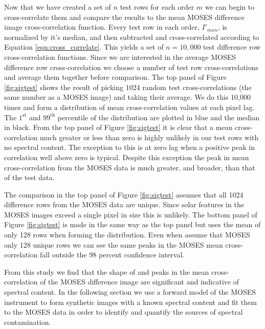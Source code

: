 		Now that we have created a set of $n$ test rows for each order $m$ we can begin to cross-correlate them and compare the results to the mean MOSES difference image cross-correlation function.
		Every test row in each order, $I'_{mxn}$, is normalized by it's median, and then subtracted and cross-correlated according to Equation \ref{eqn:cross_correlate}.
		This yields a set of $n = 10,000$ test difference row cross-correlation functions.
		Since we are interested in the average MOSES difference row cross-correlation we choose a number of test row cross-correlations and average them together before comparison.
		The top panel of Figure \ref{fig:sigtest} shows the result of picking 1024 random test cross-correlations (the same number as a MOSES image) and taking their average.
		We do this 10,000 times and form a distribution of mean cross-correlation values at each pixel lag.
		The $1^\text{st}$ and $99^\text{th}$ percentile of the distribution are plotted in blue and the median in black.
		From the top panel of Figure \ref{fig:sigtest} it is clear that a mean cross-correlation much greater or less than zero is highly unlikely in our test rows with no spectral content.
		The exception to this is at zero lag when a positive peak in correlation well above zero is typical.
		Despite this exception the peak in mean cross-correlation from the MOSES data is much greater, and broader, than that of the test data.
		
		The comparison in the top panel of Figure \ref{fig:sigtest} assumes that all 1024 difference rows from the MOSES data are unique.
		Since solar features in the MOSES images exceed a single pixel in size this is unlikely.
		The bottom panel of Figure \ref{fig:sigtest} is made in the same way as the top panel but uses the mean of only 128 rows when forming the distribution.
		Even when assume that MOSES only 128 unique rows we can see the same peaks in the MOSES mean cross-correlation fall outside the 98 percent confidence interval.
		
		From this study we find that the shape of and peaks in the mean cross-correlation of the MOSES difference image are significant and indicative of spectral content.
		In the following section we use a forward model of the MOSES instrument to form synthetic images with a known spectral content and fit them to the MOSES data in order to identify and quantify the sources of spectral contamination.
			
	

